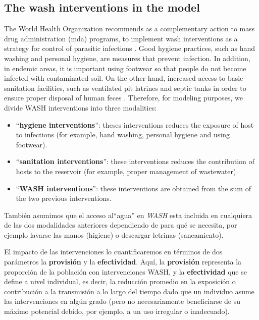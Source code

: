 \documentclass[12pt,a4paper]{article}
\theoremstyle{plain}%
\theoremstyle{definition}
\theoremstyle{remark}
\begin{document}
	\subsection{The wash interventions in the model}
	The World Health Organization recommends as a complementary action to mass drug administration (mda) programs, to implement wash interventions as a strategy for control of parasitic infections \cite{who2012soil}.
	Good hygiene practices, such as hand washing and personal hygiene, are measures that prevent infection. In addition, in endemic areas, it is important using footwear so that people do not become infected with contaminated soil. 
	On the other hand, increased access to basic sanitation facilities, such as ventilated pit latrines and septic tanks in order to ensure proper disposal of human feces \cite{paho2003,who2012soil}.
	Therefore, for modeling purposes, we divide WASH interventions into three modalities:
	\begin{itemize}
		\item ``\textbf{hygiene interventions}'': theses interventions reduces the exposure of host to infections (for example, hand washing, personal hygiene and using footwear).
		\item  ``\textbf{sanitation interventions}'': these interventions reduces the contribution of hosts to the reservoir (for example, proper management of wastewater).
		\item ``\textbf{WASH interventions}'': these interventions are obtained from the sum of the two previous interventions.
	\end{itemize}
	{\color{red}
	También
	asumimos que el acceso al``agua'' en \textit{WASH} esta incluida en cualquiera de las dos modalidades anteriores  dependiendo de para qué se necesita, por ejemplo  lavarse las manos (higiene) o descargar letrinas (saneamiento)\cite{coffeng2018predicted}.
	
	El impacto de las intervenciones lo cuantificaremos en términos
	de dos parámetros la \textbf{provisión} y la \textbf{efectividad}. 	
	 Aquí, la \textbf{provisión}  representa la proporción de la población con intervenciones WASH, y la \textbf{efectividad} que se define a nivel individual, es decir, la reducción promedio en la exposición o contribución a la transmisión a lo largo del tiempo dado que un individuo asume las intervenciones en algún grado (pero no necesariamente beneficiarse de su máximo potencial debido, por ejemplo, a un uso irregular o inadecuado).
	}
	 
\end{document}
